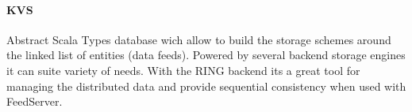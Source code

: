 \paragraph{KVS}
Abstract Scala Types database wich allow to build the storage schemes around the linked list of entities (data feeds).
Powered by several backend storage engines it can suite variety of needs.
With the RING backend its a great tool for managing the distributed data and provide sequential consistency when used with FeedServer.

